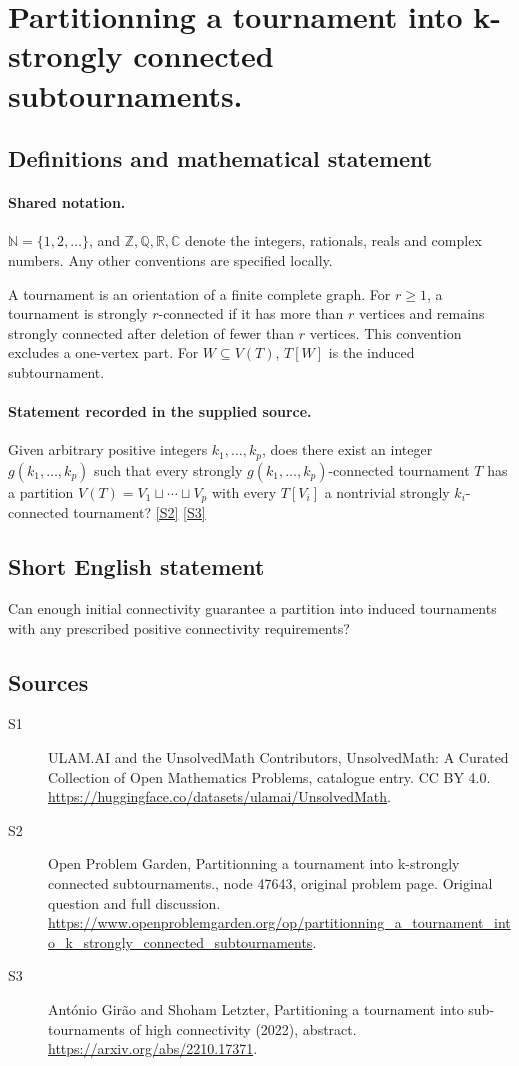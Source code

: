 \documentclass[11pt]{article}
\newcommand{\sref}[2]{\hyperlink{source:#1:#2}{[S#2]}}
\begin{document}
\section{Partitionning a tournament into k-strongly connected subtournaments.}\label{statement}

\subsection{Definitions and mathematical statement}

\paragraph{Shared notation.}$\mathbb N=\{1,2,\ldots\}$, and $\mathbb Z,\mathbb Q,\mathbb R,\mathbb C$ denote the integers, rationals, reals and complex numbers. Any other conventions are specified locally.


A tournament is an orientation of a finite complete graph. For $r\geq1$, a tournament is strongly $r$-connected if it has more than $r$ vertices and remains strongly connected after deletion of fewer than $r$ vertices. This convention excludes a one-vertex part. For $W\subseteq V(T)$, $T[W]$ is the induced subtournament.
\paragraph{Statement recorded in the supplied source.}
Given arbitrary positive integers $k_1,\ldots,k_p$, does there exist an integer $g(k_1,\ldots,k_p)$ such that every strongly $g(k_1,\ldots,k_p)$-connected tournament $T$ has a partition $V(T)=V_1\sqcup\cdots\sqcup V_p$ with every $T[V_i]$ a nontrivial strongly $k_i$-connected tournament? \sref{statement}{2} \sref{statement}{3}
\subsection{Short English statement}
Can enough initial connectivity guarantee a partition into induced tournaments with any prescribed positive connectivity requirements?
\subsection{Sources}
\begin{description}
\item[\hypertarget{source:statement:1}{S1}] ULAM.AI and the UnsolvedMath Contributors, UnsolvedMath: A Curated Collection of Open Mathematics Problems, catalogue entry. CC BY 4.0. \url{https://huggingface.co/datasets/ulamai/UnsolvedMath}.
\item[\hypertarget{source:statement:2}{S2}] Open Problem Garden, Partitionning a tournament into k-strongly connected subtournaments., node 47643, original problem page. Original question and full discussion. \url{https://www.openproblemgarden.org/op/partitionning_a_tournament_into_k_strongly_connected_subtournaments}.
\item[\hypertarget{source:statement:3}{S3}] António Girão and Shoham Letzter, Partitioning a tournament into sub-tournaments of high connectivity (2022), abstract. \url{https://arxiv.org/abs/2210.17371}.
\end{description}
\label{end:statement}
\end{document}
